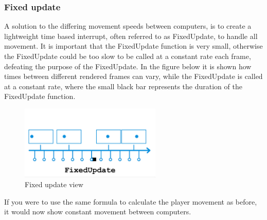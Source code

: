 \documentclass{article} %
\begin{document}
\subsubsection{Fixed update}
A solution to the differing movement speeds between computers, is to create a lightweight time based interrupt, often referred to as FixedUpdate, to handle all movement.
It is important that the FixedUpdate function is very small, otherwise the FixedUpdate could be too slow to be called at a constant rate each frame, defeating the purpose of the FixedUpdate.
In the figure below it is shown how times between different rendered frames can vary, while the FixedUpdate is called at a constant rate, where the small black bar represents the duration of the FixedUpdate function.
\begin{figure}[h!]
	\centering
	\includegraphics[width=0.6\textwidth]{fixed_update_explanation.png}
	\caption{Fixed update view}
\end{figure}
\newline
If you were to use the same formula to calculate the player movement as before, it would now show constant movement between computers.
\end{document}
